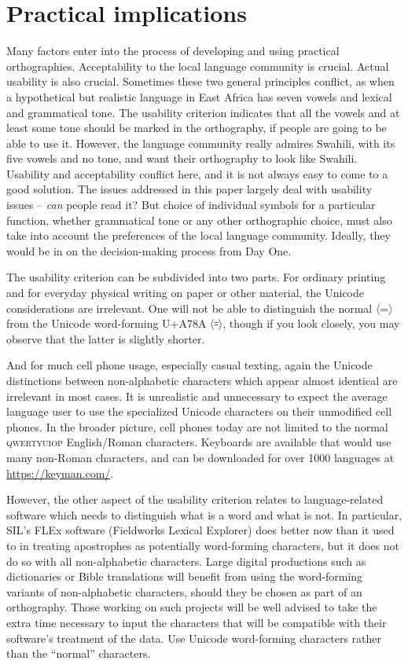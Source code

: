 \documentclass[output=paper]{langscibook}
\begin{document}
\section{Practical implications}\label{sec:cahill:5}
Many factors enter into the process of developing and using practical orthographies. Acceptability to the local language community is crucial. Actual usability is also crucial. Sometimes these two general principles conflict, as when a hypothetical but realistic language in East Africa has seven vowels and lexical and grammatical tone. The usability criterion indicates that all the vowels and at least some tone should be marked in the orthography, if people are going to be able to use it. However, the language community really admires Swahili, with its five vowels and no tone, and want their orthography to look like Swahili. Usability and acceptability conflict here, and it is not always easy to come to a good solution. The issues addressed in this paper largely deal with usability issues – \textit{can}  people read it? But choice of individual symbols for a particular function, whether grammatical tone or any other orthographic choice, must also take into account the preferences of the local language community. Ideally, they would be in on the decision-making process from Day One. 

The usability criterion can be subdivided into two parts. For ordinary printing and for everyday physical writing on paper or other material, the Unicode considerations are irrelevant. One will not be able to distinguish the normal 〈=〉 from the Unicode word-forming U+A78A 〈{꞊}〉, though if you look closely, you may observe that the latter is slightly shorter. 

And for much cell phone usage, especially casual texting, again the Unicode distinctions between non-alphabetic characters which appear almost identical are irrelevant in most cases.  It is unrealistic and unnecessary to expect the average language user to use the specialized Unicode characters on their unmodified cell phones. In the broader picture, cell phones today are not limited to the normal \textsc{qwertyuiop} English/Roman characters. Keyboards are available that would use many non-Roman characters, and can be downloaded for over 1000 languages at \url{https://keyman.com/}.

However, the other aspect of the usability criterion relates to language-related software which needs to distinguish what is a word and what is not. In particular, SIL’s FLEx software (Fieldworks Lexical Explorer) does better now than it used to in treating apostrophes as potentially word-forming characters, but it does not do so with all non-alphabetic characters. Large digital productions such as dictionaries or Bible translations will benefit from using the word-forming variants of non-alphabetic characters, should they be chosen as part of an orthography. Those working on such projects will be well advised to take the extra time necessary to input the characters that will be compatible with their software’s treatment of the data. Use Unicode word-forming characters rather than the “normal” characters.
\end{document}

